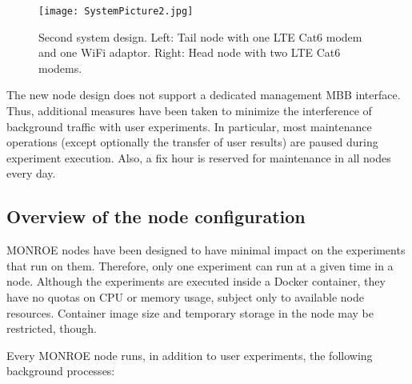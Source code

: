 \documentclass[a4paper,10pt]{article}
\newcommand{\monroe}{MONROE}
\begin{document}
\begin{figure}[tp]
	\centering
	\texttt{[image: SystemPicture2.jpg]}
	\caption{Second system design. Left: Tail node with one LTE Cat6 modem and one WiFi adaptor. Right: Head node with two LTE Cat6 modems.}
	\label{fig:secondNodeDesign}
\end{figure}

The new node design does not support a dedicated management MBB interface.
Thus, additional measures have been taken to minimize the interference of background traffic with user experiments.
In particular, most maintenance operations (except optionally the transfer of user results) are paused during experiment execution.
Also, a fix hour is reserved for maintenance in all nodes every day.


\subsection{Overview of the node configuration}

\monroe{} nodes have been designed to have minimal impact on the experiments that run on them.
Therefore, only one experiment can run at a given time in a node.
Although the experiments are executed inside a Docker container, they have no quotas on CPU or memory usage, subject only to available node resources.
Container image size and temporary storage in the node may be restricted, though.

Every \monroe{} node runs, in addition to user experiments, the following background processes:
\end{document}
